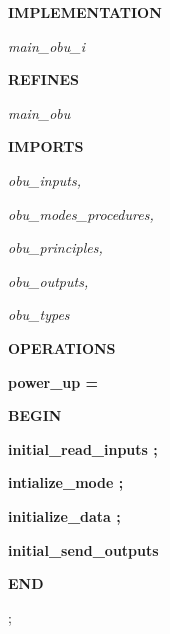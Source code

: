 
\begin{minipage}{20cm}


 

 

\bf IMPLEMENTATION

\hspace*{0.15in}\it main\_obu\_i

\bf REFINES

\hspace*{0.20in}\it main\_obu

\hspace*{0.20in}

\bf IMPORTS

\hspace*{0.20in}\it obu\_inputs\rm ,

\hspace*{0.20in}\it obu\_modes\_procedures\rm ,

\hspace*{0.20in}\it obu\_principles\rm ,

\hspace*{0.20in}\it obu\_outputs\rm , 

\hspace*{0.20in}\it obu\_types

\vspace*{4mm}
\bf OPERATIONS

\hspace*{0.15in}\bf power\_up \rm =

\hspace*{0.15in}\bf BEGIN

\hspace*{0.35in}\bf initial\_read\_inputs \rm ;

\hspace*{0.35in}

\hspace*{0.35in}\bf intialize\_mode \rm ; \hspace*{0.35in}

\hspace*{0.35in}\bf initialize\_data \rm ; \hspace*{0.35in}

\hspace*{0.35in}\bf initial\_send\_outputs

\hspace*{0.15in}\bf END

\hspace*{0.15in}\rm ;


\end{minipage}
